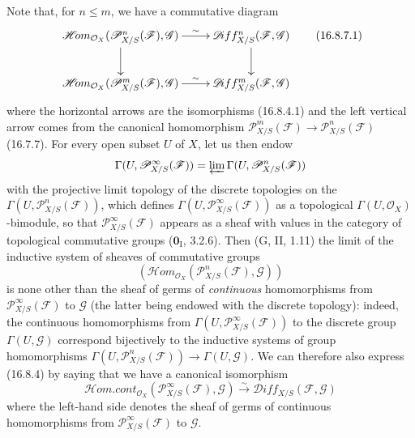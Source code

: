 \begin{env}[16.8.7]
Note that, for $n\leq m$, we have a commutative diagram
\[
  \xymatrix{
    \mathscr{H}\!om_{\mathcal{O}_X}
      (\mathscr{P}_{X/S}^n(\mathscr{F}),\mathscr{G})
      \ar[r]^-{\sim}\ar[d]
      &\mathscr{D}\!iff_{X/S}^n(\mathscr{F},\mathscr{G})\ar[d]\\
    \mathscr{H}\!om_{\mathcal{O}_X}
      (\mathscr{P}_{X/S}^m(\mathscr{F}),\mathscr{G})
      \ar[r]^-{\sim}
      &\mathscr{D}\!iff_{X/S}^m(\mathscr{F},\mathscr{G})
  }
  \tag{16.8.7.1}
  \label{IV.16.8.7.1}
\]
where the horizontal arrows are the isomorphisms (16.8.4.1) and the left
vertical arrow comes from the canonical homomorphism
$\mathscr{P}_{X/S}^m(\mathscr{F})\to
\mathscr{P}_{X/S}^n(\mathscr{F})$ (16.7.7). For every open subset $U$ of $X$,
let us then endow
\[
  \Gamma(U,\mathscr{P}_{X/S}^{\infty}(\mathscr{F}))
  =\varprojlim\Gamma(U,\mathscr{P}_{X/S}^n(\mathscr{F}))
\]
with the projective limit topology of the discrete topologies on the
$\Gamma(U,\mathscr{P}_{X/S}^n(\mathscr{F}))$, which defines
$\Gamma(U,\mathscr{P}_{X/S}^{\infty}(\mathscr{F}))$ as a topological
$\Gamma(U,\mathcal{O}_X)$-bimodule, so that
$\mathscr{P}_{X/S}^{\infty}(\mathscr{F})$ appears as a sheaf with values
in the category of topological commutative groups
($\mathbf{0}_{\mathrm I}$, 3.2.6). Then (G, II, 1.11) the limit of the inductive
system of sheaves of commutative groups
\[
  (\mathscr{H}\!om_{\mathcal{O}_X}
  (\mathscr{P}_{X/S}^n(\mathscr{F}),\mathscr{G}))
\]
is none other than the sheaf of germs of \emph{continuous} homomorphisms from
$\mathscr{P}_{X/S}^{\infty}(\mathscr{F})$ to $\mathscr{G}$ (the latter
being endowed with the discrete topology): indeed, the continuous
homomorphisms from $\Gamma(U,\mathscr{P}_{X/S}^{\infty}(\mathscr{F}))$ to the
discrete group $\Gamma(U,\mathscr{G})$ correspond bijectively to the
inductive systems of group homomorphisms
$\Gamma(U,\mathscr{P}_{X/S}^n(\mathscr{F}))\to\Gamma(U,\mathscr{G})$. We
can therefore also express (16.8.4) by saying that we have a canonical
isomorphism
\[
  \mathscr{H}\!om.\mathit{cont}_{\mathcal{O}_X}
  (\mathscr{P}_{X/S}^{\infty}(\mathscr{F}),\mathscr{G})
  \xrightarrow{\sim}
  \mathscr{D}\!iff_{X/S}(\mathscr{F},\mathscr{G})
\]
where the left-hand side denotes the sheaf of germs of continuous
homomorphisms from $\mathscr{P}_{X/S}^{\infty}(\mathscr{F})$ to $\mathscr{G}$.
\end{env}


